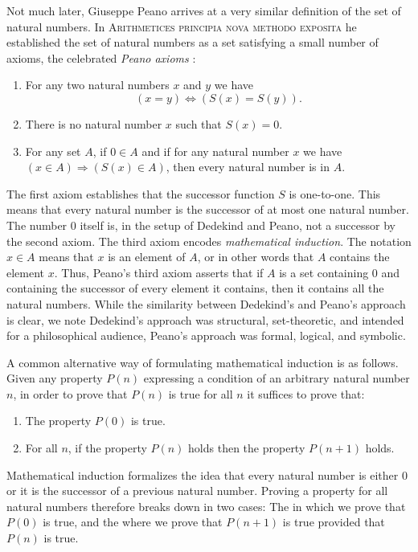 Not much later, Giuseppe Peano arrives at a very similar definition of the set of natural numbers. In \textsc{Arithmetices principia nova methodo exposita} he established the set of natural numbers as a set satisfying a small number of axioms, the celebrated \emph{Peano axioms} \cite{peano1889}:
\begin{enumerate}
\item For any two natural numbers $x$ and $y$ we have
  \begin{equation*}
    (x=y)\Leftrightarrow (S(x)=S(y)).
  \end{equation*}
\item There is no natural number $x$ such that $S(x)=0$.
\item For any set $A$, if $0\in A$ and if for any natural number $x$ we have $(x\in A) \Rightarrow (S(x)\in A)$, then every natural number is in $A$.
\end{enumerate}
The first axiom establishes that the successor function $S$ is one-to-one. This means that every natural number is the successor of at most one natural number. The number $0$ itself is, in the setup of Dedekind and Peano, not a successor by the second axiom. The third axiom encodes \emph{mathematical induction}. The notation $x\in A$ means that $x$ is an element of $A$, or in other words that $A$ contains the element $x$. Thus, Peano's third axiom asserts that if $A$ is a set containing $0$ and containing the successor of every element it contains, then it contains all the natural numbers. While the similarity between Dedekind's and Peano's approach is clear, we note Dedekind's approach was structural, set-theoretic, and intended for a philosophical audience, Peano's approach was formal, logical, and symbolic.

A common alternative way of formulating mathematical induction is as follows. Given any property $P(n)$ expressing a condition of an arbitrary natural number $n$, in order to prove that $P(n)$ is true for all $n$ it suffices to prove that:
\begin{enumerate}
\item The property $P(0)$ is true.
\item For all $n$, if the property $P(n)$ holds then the property $P(n+1)$ holds.
\end{enumerate}
Mathematical induction formalizes the idea that every natural number is either $0$ or it is the successor of a previous natural number. Proving a property for all natural numbers therefore breaks down in two cases: The  in which we prove that $P(0)$ is true, and the  where we prove that $P(n+1)$ is true provided that $P(n)$ is true.


